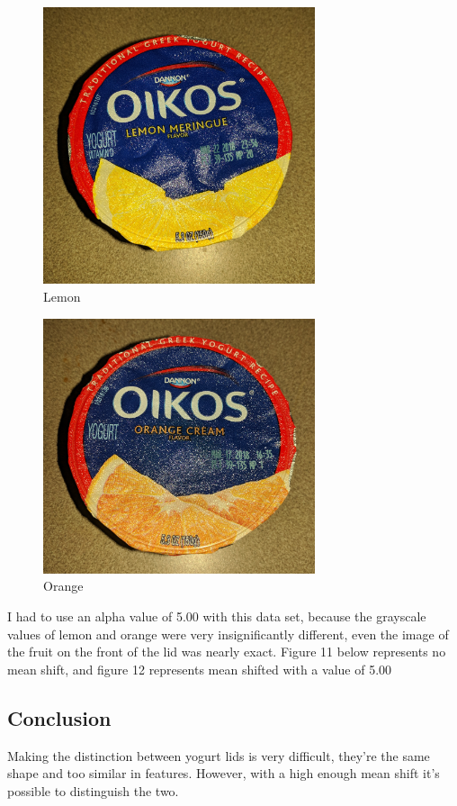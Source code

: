 \documentclass[12pt, letterpaper]{article}
\begin{document}
\begin{figure}[H]
\centering
\includegraphics[width=8cm]{lemon}
\caption{{Lemon}}
\label{fig:lemon}
\end{figure}

\begin{figure}[H]
\centering
\includegraphics[width=8cm]{orange}
\caption{{Orange}}
\label{fig:orange}
\end{figure}


I had to use an alpha value of 5.00 with this data set, because the grayscale values of lemon and orange were very insignificantly different, even the image of the fruit on the front of the lid was nearly exact. Figure 11  below represents no mean shift, and figure 12 represents mean shifted with a value of 5.00

\subsection{Conclusion}

Making the distinction between yogurt lids is very difficult, they're the same shape and too similar in features. However, with a high enough mean shift it's possible to distinguish the two.
\end{document}
